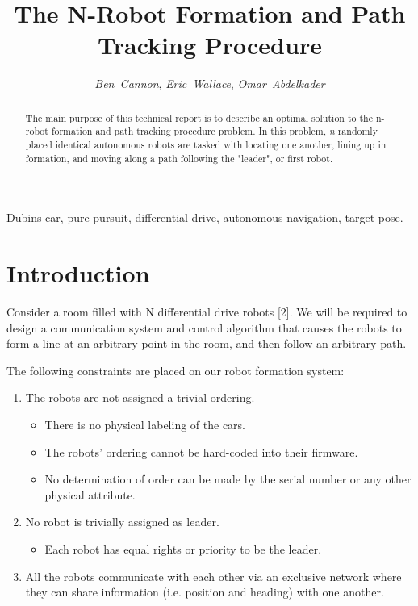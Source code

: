 \documentclass[journal]{IEEEtran}
\begin{document}
\title{The N-Robot Formation and Path Tracking Procedure}
\author{\textit{Ben~Cannon}, \textit{Eric~Wallace}, \textit{Omar~Abdelkader}}

\maketitle

\begin{abstract}
    The main purpose of this technical report is to describe an optimal solution to the n-robot formation and path tracking procedure problem. In this problem, \textit{n} randomly placed identical autonomous robots are tasked with locating one another, lining up in formation, and moving along a path following the "leader", or first robot.
\end{abstract}

\begin{IEEEkeywords}
    Dubins car, pure pursuit, differential drive, autonomous navigation, target pose.
\end{IEEEkeywords}

\section{Introduction}
    Consider a room filled with N differential drive robots [2]. We will be required to design a communication system and control algorithm that causes the robots to form a line at an arbitrary point in the room, and then follow an arbitrary path.
    
    The following constraints are placed on our robot formation system:
    
    \begin{enumerate}
        \item The robots are not assigned a trivial ordering.
            \begin{itemize}
                \item There is no physical labeling of the cars.
                \item The robots' ordering cannot be hard-coded into their firmware.
                \item No determination of order can be made by the serial number or any other physical attribute.
            \end{itemize}
        \item No robot is trivially assigned as leader.
            \begin{itemize}
                \item Each robot has equal rights or priority to be the leader.
            \end{itemize}
        \item All the robots communicate with each other via an exclusive network where they can share information (i.e. position and heading) with one another.
    \end{enumerate}
    
\end{document}
